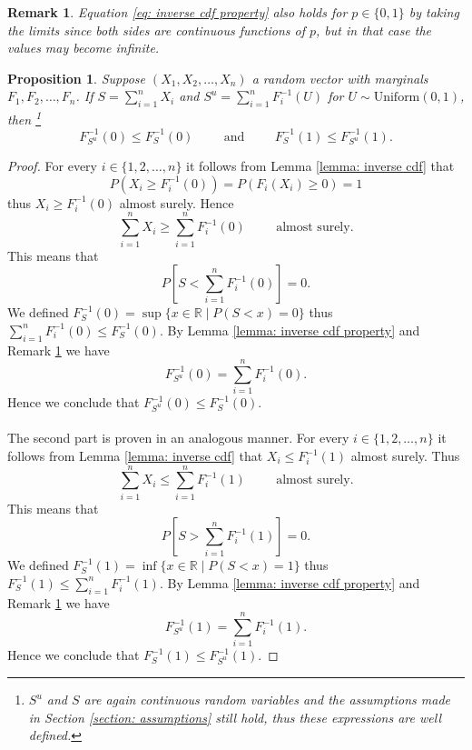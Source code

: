 \documentclass{article}
\newtheorem{proposition}{Proposition}
\newtheorem{remark}{Remark}
\begin{document}
\begin{remark}\label{remark: inverse cdf property}
    Equation \eqref{eq: inverse cdf property} also holds for $p\in \{0,1\}$ by taking the limits since both sides are continuous functions of $p$, but in that case the values may become infinite.
\end{remark}
\begin{proposition}\label{prop: limits domains S and S^u}
    Suppose $(X_1,X_2,\dots,X_n)$ a random vector with marginals $F_1,F_2,\dots,F_n$. If $S = \sum_{i=1}^nX_i$ and $S^u = \sum_{i=1}^nF_i^{-1}(U)$ for $U\sim \text{Uniform}(0,1)$, then \footnote{$S^u$ and $S$ are again continuous random variables and the assumptions made in Section \ref{section: assumptions} still hold, thus these expressions are well defined.}
    $$F_{S^u}^{-1}(0) \leq F_{S}^{-1}(0)\hspace{1cm}\text{and} \hspace{1cm}F_S^{-1}(1) \leq F_{S^u}^{-1}(1).$$
\end{proposition}
\begin{proof}
    For every $i\in \{1,2,\dots,n\}$ it follows from Lemma \ref{lemma: inverse cdf} that
    $$P(X_i \geq F_i^{-1}(0)) = P(F_i(X_i) \geq 0) = 1$$
    thus $X_i \geq F_i^{-1}(0)$ almost surely. Hence $$\sum_{i=1}^nX_i \geq \sum_{i=1}^nF_i^{-1}(0) \hspace{1cm} \text{almost surely}.$$
    This means that $$P\left[S < \sum_{i=1}^nF_i^{-1}(0) \right] = 0.$$
    We defined $F^{-1}_S(0) = \sup\{x\in \mathbb{R}\mid P(S < x) = 0\}$ thus $\sum_{i=1}^nF_i^{-1}(0) \leq F^{-1}_S(0).$ By Lemma \ref{lemma: inverse cdf property} and Remark \ref{remark: inverse cdf property} we have
    $$F_{S^u}^{-1}(0) = \sum_{i=1}^nF_i^{-1}(0).$$
    Hence we conclude that $F_{S^u}^{-1}(0) \leq F_S^{-1}(0)$. \\\\
    The second part is proven in an analogous manner. For every $i\in \{1,2,\dots,n\}$ it follows from Lemma \ref{lemma: inverse cdf} that $X_i \leq F_i^{-1}(1)$ almost surely. Thus $$\sum_{i=1}^nX_i \leq \sum_{i=1}^nF_i^{-1}(1) \hspace{1cm} \text{almost surely}.$$
    This means that $$P\left[S > \sum_{i=1}^nF_i^{-1}(1) \right] = 0.$$
    We defined $F^{-1}_S(1) = \inf\{x\in \mathbb{R}\mid P(S < x) = 1\}$ thus $F^{-1}_S(1) \leq \sum_{i=1}^nF_i^{-1}(1)$. By Lemma \ref{lemma: inverse cdf property} and Remark \ref{remark: inverse cdf property} we have
    $$F_{S^u}^{-1}(1) = \sum_{i=1}^nF_i^{-1}(1).$$
    Hence we conclude that $F_{S}^{-1}(1) \leq F_{S^u}^{-1}(1)$.
\end{proof}
\end{document}
